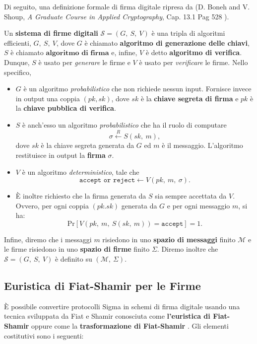 Di seguito, una definizione formale di firma digitale ripresa da (D. Boneh and V. Shoup, \textit{A Graduate Course in Applied Cryptography}, Cap. 13.1 Pag 528 \cite{boneh2020applied}).
\begin{de}
    Un \textbf{sistema di firme digitali} $\mathcal{S} = (G,\ S,\ V)$ è una tripla di algoritmi efficienti, $G,\ S,\ V$, dove $G$ è chiamato \textbf{algoritmo di generazione delle chiavi}, $S$ è chiamato $\textbf{algoritmo di firma}$ e, infine, $V$ è detto \textbf{algoritmo di verifica}. Dunque, $S$ è usato per \textit{generare} le firme e $V$ è usato per \textit{verificare} le firme.
    Nello specifico,
    \begin{itemize}
        \item $G$ è un algoritmo \textit{probabilistico} che non richiede nessun input. Fornisce invece in output una coppia $(pk, sk)$, dove $sk$ è la \textbf{chiave segreta di firma} e $pk$ è la \textbf{chiave pubblica di verifica}.
        \item $S$ è anch'esso un algoritmo \textit{probabilistico} che ha il ruolo di computare 
        \[\sigma \overset{R}{\leftarrow} S(sk,\ m),\]
        dove $sk$ è la chiave segreta generata da $G$ ed $m$ è il messaggio. L'algoritmo restituisce in output la \textbf{firma} $\sigma$.
        \item $V$ è un algoritmo \textit{deterministico}, tale che 
        \[\texttt{accept or reject} \leftarrow V(pk,\ m,\ \sigma).\]
        \item È inoltre richiesto che la firma generata da $S$ sia sempre accettata da $V$. Ovvero, per ogni coppia $(pk. sk)$ generata da $G$ e per ogni messaggio $m$, si ha:
        \[\text{Pr}[V(pk,\ m,\ S(sk,\ m)) = \texttt{accept}] = 1.\]
    \end{itemize}
    Infine, diremo che i messaggi $m$ risiedono in uno \textbf{spazio di messaggi} finito $\mathcal{M}$ e le firme risiedono in uno \textbf{spazio di firme} finito $\Sigma$. Diremo inoltre che $\mathcal{S} = (G,\ S,\ V)$ è definito su $(\mathcal{M},\ \Sigma)$.
\end{de}

\subsection{Euristica di Fiat-Shamir per le Firme}\label{sec:fiat-shamir}

È possibile convertire protocolli Sigma in schemi di firma digitale usando una tecnica sviluppata da Fiat e Shamir conosciuta come \textbf{l'euristica di Fiat-Shamir} oppure come la \textbf{trasformazione di Fiat-Shamir} \cite{10.1007/3-540-47721-7_12}. Gli elementi costitutivi sono i seguenti:

